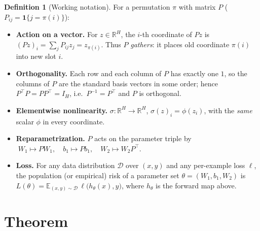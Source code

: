 \documentclass[11pt]{article}
\theoremstyle{definition}
\newtheorem{definition}[theorem]{Definition}
\theoremstyle{remark}
\begin{document}
\begin{definition}[Working notation]
For a permutation $\pi$ with matrix $P$ ($P_{ij}=\mathbf 1\{j=\pi(i)\}$):
\begin{itemize}
  \item \textbf{Action on a vector.} For $z\in\mathbb{R}^H$, the $i$-th coordinate of $Pz$ is
  $(Pz)_i=\sum_{j}P_{ij}z_j=z_{\pi(i)}$. Thus $P$ \emph{gathers}: it places old coordinate
  $\pi(i)$ into new slot $i$.
  \item \textbf{Orthogonality.} Each row and each column of $P$ has exactly one $1$, so the columns
  of $P$ are the standard basis vectors in some order; hence $P^{\top}P=PP^{\top}=I_H$, i.e.\
  $P^{-1}=P^{\top}$ and $P$ is orthogonal.
  \item \textbf{Elementwise nonlinearity.} $\sigma:\mathbb{R}^H\to\mathbb{R}^H$,
  $\sigma(z)_i=\phi(z_i)$, with the \emph{same} scalar $\phi$ in every coordinate.
  \item \textbf{Reparametrization.} $P$ acts on the parameter triple by
  $\;W_1\mapsto P W_1,\quad b_1\mapsto P b_1,\quad W_2\mapsto W_2 P^{\top}.$
  \item \textbf{Loss.} For any data distribution $\mathcal D$ over $(x,y)$ and any per-example loss
  $\ell$, the population (or empirical) risk of a parameter set $\theta=(W_1,b_1,W_2)$ is
  $L(\theta)=\mathbb{E}_{(x,y)\sim\mathcal D}\,\ell\bigl(h_\theta(x),y\bigr)$, where $h_\theta$ is the
  forward map above.
\end{itemize}
\end{definition}

\section*{Theorem}
\end{document}
